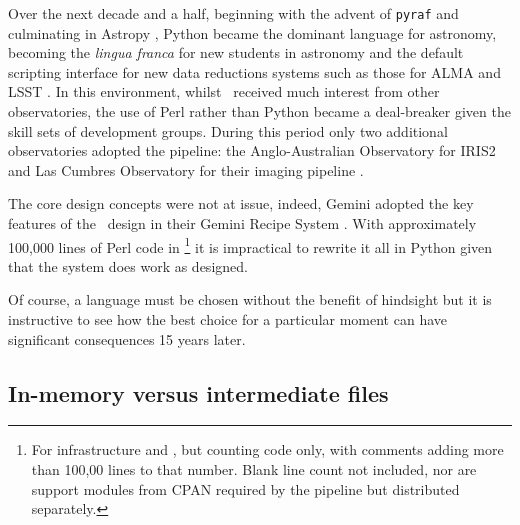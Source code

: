 \documentclass[final,authoryear,5p,times,twocolumn]{elsarticle}
\begin{document}
Over the next decade and a half, beginning with the advent of \texttt{pyraf}
\citep[][]{2000ASPC..216...59G,2006hstc.conf..437G}
and culminating in Astropy \citep[][]{2013A&A...558A..33A},
Python became the dominant language for astronomy,
becoming the \emph{lingua franca} for new students in astronomy and
the default scripting interface for new data reductions systems such
as those for ALMA
\citep{2007ASPC..376..127M} and LSST \citep{2010SPIE.7740E..15A}.
In this environment, whilst \oracdr\ received much interest from other
observatories, the use of Perl rather than Python became a
deal-breaker given the skill sets of development groups. During this
period only two additional observatories adopted the pipeline: the
Anglo-Australian Observatory for IRIS2 \citep{2004SPIE.5492..998T} and Las Cumbres
Observatory for their imaging pipeline \citep{2013PASP..125.1031B}.

The core design concepts were not at issue, indeed, Gemini adopted the
key features of the \oracdr\ design in their Gemini Recipe System
\citep{2014ASPC..485..359L}. With approximately 100,000 lines of Perl code in
\oracdr\footnote{For infrastructure and \primitives, but counting code only, with comments adding more than
  100,00 lines to that
  number. Blank line count not included, nor are support modules from CPAN
  required by the pipeline but distributed separately.} it
is impractical to rewrite it all in Python given that the system does
work as designed.

Of course, a language must be chosen without the benefit of hindsight
but it is instructive to see how the best choice for a particular
moment can have significant consequences 15 years later.

\subsection{In-memory versus intermediate files}
\end{document}
